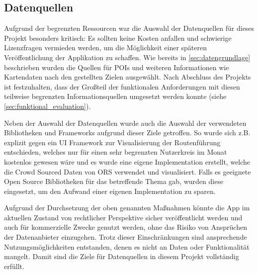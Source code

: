 	
	
	\subsection{Datenquellen}
	Aufgrund der begrenzten Ressourcen war die Auswahl der Datenquellen für dieses Projekt besonders kritisch: Es sollten keine Kosten anfallen und schwierige Lizenzfragen vermieden werden, um die Möglichkeit einer späteren Veröffentlichung der Applikation zu schaffen. Wie bereits in \autoref{sec:datengrundlage} beschrieben wurden die Quellen für \acs{POI}s und weiteren Informationen wie Kartendaten nach den gestellten Zielen ausgewählt. Nach Abschluss des Projekts ist festzuhalten, dass der Großteil der funktionalen Anforderungen mit diesen teilweise begrenzten Informationsquellen umgesetzt werden konnte (siehe \autoref{sec:funktional_evaluation}).
	
	\vspace{0.25cm}
	
	Neben der Auswahl der Datenquellen wurde auch die Auswahl der verwendeten Bibliotheken und Frameworks aufgrund dieser Ziele getroffen. So wurde sich z.B. explizit gegen ein UI Framework zur Visualisierung der Routenführung entschieden, welches nur für einen sehr begrenzten Nutzerkreis im Monat kostenlos gewesen wäre und es wurde eine eigene Implementation erstellt, welche die Crowd Sourced Daten von \acs{ORS} verwendet und visualisiert. Falls es geeignete Open Source Bibliotheken für das betreffende Thema gab, wurden diese eingesetzt, um den Aufwand einer eigenen Implementation zu sparen.
	
	\vspace{0.25cm}
	
	Aufgrund der Durchsetzung der oben genannten Maßnahmen könnte die App im aktuellen Zustand von rechtlicher Perspektive sicher veröffentlicht werden und auch für kommerzielle Zwecke genutzt werden, ohne das Risiko von Ansprüchen der Datenanbieter einzugehen. Trotz dieser Einschränkungen sind ansprechende Nutzungsmöglichkeiten entstanden, denen es nicht an Daten oder Funktionalität mangelt. Damit sind die Ziele für Datenquellen in diesem Projekt vollständig erfüllt.